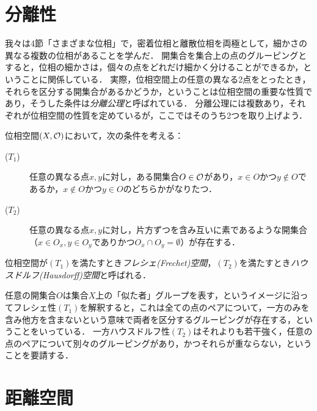 \documentclass[11pt,a4paper]{jsarticle}
\begin{document}
\section{分離性}
我々は4節「さまざまな位相」で，密着位相と離散位相を両極として，細かさの異なる複数の位相があることを学んだ．
開集合を集合上の点のグルーピングとすると，位相の細かさは，個々の点をどれだけ細かく分けることができるか，ということに関係している．
実際，位相空間上の任意の異なる2点をとったとき，それらを区分する開集合があるかどうか，ということは位相空間の重要な性質であり，そうした条件は\emph{分離公理}と呼ばれている．
分離公理には複数あり，それぞれが位相空間の性質を定めているが，ここではそのうち2つを取り上げよう．

\begin{dfn}
位相空間$(X, \mathcal{O})$において，次の条件を考える：
\begin{description}
 \item[($T_1$)] 任意の異なる点$x, y$に対し，ある開集合$O \in \mathcal{O}$があり，$x \in O$かつ$y \not\in O$であるか，$x \not\in O$かつ$y \in O$のどちらかがなりたつ．
 \item[($T_2$)] 任意の異なる点$x, y$に対し，片方ずつを含み互いに素であるような開集合（$x \in O_x, y \in O_y$でありかつ$O_x \cap O_y = \emptyset$）が存在する．
\end{description} 
位相空間が$(T_1)$を満たすとき\emph{フレシェ(Frechet)空間}，$(T_2)$を満たすとき\emph{ハウスドルフ(Hausdorff)空間}と呼ばれる．
\end{dfn}

任意の開集合$O$は集合$X$上の「似た者」グループを表す，というイメージに沿ってフレシェ性$(T_1)$を解釈すると，これは全ての点のペアについて，一方のみを含み他方を含まないという意味で両者を区分するグルーピングが存在する，ということをいっている．
一方ハウスドルフ性$(T_2)$はそれよりも若干強く，任意の点のペアについて別々のグルーピングがあり，かつそれらが重ならない，ということを要請する．






\section{距離空間}
\end{document}
